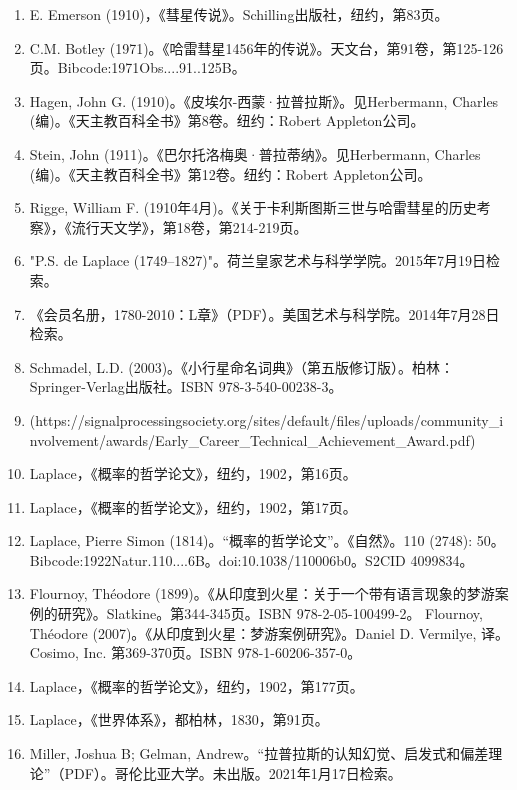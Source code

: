 \begin{enumerate}
\item E. Emerson (1910)，《彗星传说》。Schilling出版社，纽约，第83页。
\item C.M. Botley (1971)。《哈雷彗星1456年的传说》。天文台，第91卷，第125-126页。Bibcode:1971Obs....91..125B。  
\item Hagen, John G. (1910)。《皮埃尔-西蒙·拉普拉斯》。见Herbermann, Charles (编)。《天主教百科全书》第8卷。纽约：Robert Appleton公司。  
\item Stein, John (1911)。《巴尔托洛梅奥·普拉蒂纳》。见Herbermann, Charles (编)。《天主教百科全书》第12卷。纽约：Robert Appleton公司。  
\item Rigge, William F. (1910年4月)。《关于卡利斯图斯三世与哈雷彗星的历史考察》，《流行天文学》，第18卷，第214-219页。  
\item "P.S. de Laplace (1749–1827)"。荷兰皇家艺术与科学学院。2015年7月19日检索。  
\item 《会员名册，1780-2010：L章》（PDF）。美国艺术与科学院。2014年7月28日检索。  
\item Schmadel, L.D. (2003)。《小行星命名词典》（第五版修订版）。柏林：Springer-Verlag出版社。ISBN 978-3-540-00238-3。  
\item [https://signalprocessingsociety.org/sites/default/files/uploads/community_involvement/awards/Early_Career_Technical_Achievement_Award.pdf](https://signalprocessingsociety.org/sites/default/files/uploads/community_involvement/awards/Early_Career_Technical_Achievement_Award.pdf)  
\item Laplace，《概率的哲学论文》，纽约，1902，第16页。  
\item Laplace，《概率的哲学论文》，纽约，1902，第17页。
\item Laplace, Pierre Simon (1814)。“概率的哲学论文”。《自然》。110 (2748): 50。Bibcode:1922Natur.110....6B。doi:10.1038/110006b0。S2CID 4099834。  
\item Flournoy, Théodore (1899)。《从印度到火星：关于一个带有语言现象的梦游案例的研究》。Slatkine。第344-345页。ISBN 978-2-05-100499-2。  
Flournoy, Théodore (2007)。《从印度到火星：梦游案例研究》。Daniel D. Vermilye, 译。Cosimo, Inc. 第369-370页。ISBN 978-1-60206-357-0。  
\item Laplace，《概率的哲学论文》，纽约，1902，第177页。  
\item Laplace，《世界体系》，都柏林，1830，第91页。  
\item Miller, Joshua B; Gelman, Andrew。“拉普拉斯的认知幻觉、启发式和偏差理论”（PDF）。哥伦比亚大学。未出版。2021年1月17日检索。
\end{enumerate}
